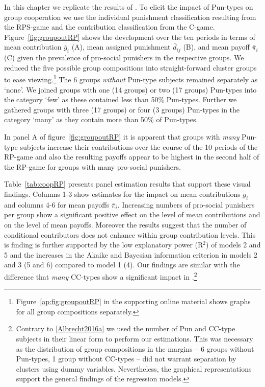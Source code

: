 \documentclass[11pt,a4paper]{article}
\begin{document}
\begin{refsection}
In this chapter we replicate the results of \cite{Albrecht2016a}.
To elicit the impact of Pun-types on group cooperation we use the individual punishment
classification resulting from the RPS-game and the contribution classification
from the C-game.
Figure~\ref{fig:groupoutRP} shows the development over the ten periods in terms
of mean contribution $\bar{g}_i$ (A), mean assigned punishment $\bar{d}_{ij}$
(B), and mean payoff $\bar{\pi}_i$ (C) given the prevalence of pro-social
punishers in the respective groups. We reduced the five possible group
compositions into straight-forward cluster groups to ease
viewing.\footnote{Figure~\ref{ap:fig:groupoutRP} in the supporting online
  material shows graphs for all group compositions separately.} The 6 groups
\emph{without} Pun-type subjects remained separately as `none'. We joined groups
with one (14 groups)
or two (17 groups) Pun-types into the category `few' as these contained less than 50\%
Pun-types. Further we gathered groups with three (17 groups) or four (3 groups)
Pun-types in the category `many' as they contain more than 50\% of Pun-types.

In panel A of figure~\ref{fig:groupoutRP}  it is apparent that groups with
\emph{many} Pun-type subjects increase their contributions over the course of
the 10 periods of the RP-game and also the resulting payoffs appear to be
highest in the second half of the RP-game for groups with many pro-social
punishers.

Table~\ref{tab:coopRP} presents panel estimation results that support these
visual findings. Columns 1-3 show estimates for the impact on mean 
contributions $\bar{g}_i$ and columns 4-6 for mean payoffs $\bar{\pi}_i$.
Increasing numbers of pro-social punishers per group show a significant positive
effect on the level of mean contributions and on the level of mean payoffs.
Moreover the results suggest that the number of conditional contributors does
not enhance within group contribution levels. This is finding is further
supported by the low explanatory power (R$^\text{2}$) of models 2 and 5 and the increases
in the Akaike and Bayesian information criterion in models 2 and 3 (5 and 6)
compared to model 1 (4). Our findings are similar with the
difference that \emph{many} CC-types show a significant impact in
\cite{Albrecht2016a}.\footnote{Contrary to \ref{Albrecht2016a} we used the
  number of Pun and CC-type subjects in their linear form to perform our
  estimations. This was necessary as the distribution of group compositions in
  the margins -- 6 groups without Pun-types, 1 group without CC-types -- did not
  warrant separation by clusters using dummy variables. Nevertheless, the
  graphical representations support the general findings of the regression models.} 



\end{refsection}
\end{document}
